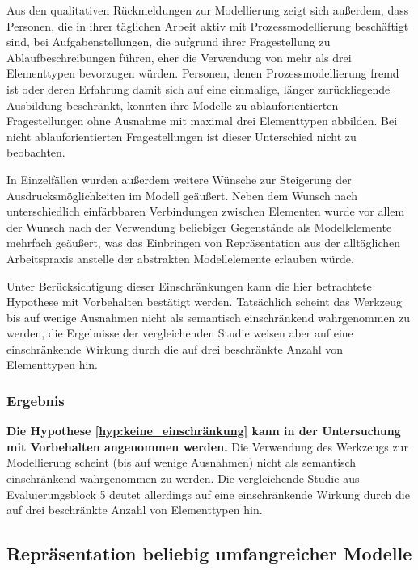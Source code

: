 Aus den qualitativen Rückmeldungen zur Modellierung zeigt sich außerdem, dass Personen, die in ihrer täglichen Arbeit aktiv mit Prozessmodellierung beschäftigt sind, bei Aufgabenstellungen, die aufgrund ihrer Fragestellung zu Ablaufbeschreibungen führen, eher die Verwendung von mehr als drei Elementtypen bevorzugen würden. Personen, denen Prozessmodellierung fremd ist oder deren Erfahrung damit sich auf eine einmalige, länger zurückliegende Ausbildung beschränkt, konnten ihre Modelle zu ablauforientierten Fragestellungen ohne Ausnahme mit maximal drei Elementtypen abbilden. Bei nicht ablauforientierten Fragestellungen ist dieser Unterschied nicht zu beobachten.

In Einzelfällen wurden außerdem weitere Wünsche zur Steigerung der Ausdrucksmöglichkeiten im Modell geäußert. Neben dem Wunsch nach unterschiedlich einfärbbaren Verbindungen zwischen Elementen wurde vor allem der Wunsch nach der Verwendung beliebiger Gegenstände als Modellelemente mehrfach geäußert, was das Einbringen von Repräsentation aus der alltäglichen Arbeitspraxis anstelle der abstrakten Modellelemente erlauben würde.

Unter Berücksichtigung dieser Einschränkungen kann die hier betrachtete Hypothese mit Vorbehalten bestätigt werden. Tatsächlich scheint das Werkzeug bis auf wenige Ausnahmen nicht als semantisch einschränkend wahrgenommen zu werden, die Ergebnisse der vergleichenden Studie weisen aber auf eine einschränkende Wirkung durch die auf drei beschränkte Anzahl von Elementtypen hin.

\subsubsection{Ergebnis} %

\textbf{Die Hypothese \ref{hyp:keine_einschränkung} kann in der Untersuchung mit Vorbehalten angenommen werden.} Die Verwendung des Werkzeugs zur Modellierung scheint (bis auf wenige Ausnahmen) nicht als semantisch einschränkend wahrgenommen zu werden. Die vergleichende Studie aus Evaluierungsblock 5 deutet allerdings auf eine einschränkende Wirkung durch die auf drei beschränkte Anzahl von Elementtypen hin.


\subsection{Repräsentation beliebig umfangreicher Modelle} %
\label{sub:repräsentation_beliebig_komplexer_modelle}

